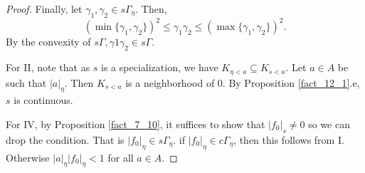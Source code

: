 \documentclass[8pt]{article}
\numberwithin{equation}{section}
\newcommand{\ab}[1]{\vert #1 \vert}
\newcommand{\cGamma}[0]{c\Gamma}
\begin{document}
\begin{proof}
    Finally, let $\gamma_1,\gamma_2\in s\Gamma_\eta$. Then,
    \begin{equation*}
        (\min\{\gamma_1,\gamma_2\})^2\leq \gamma_1\gamma_2\leq(\max\{\gamma_1,\gamma_2\})^2.
    \end{equation*}
    By the convexity of $s\Gamma,\gamma1\gamma_2\in s\Gamma$. %
    \par For II, note that as $s$ is a specialization, we have $K_{\eta<a}\subseteq K_{s<a}$. Let $a\in A$ be such that $\ab{a}_\eta$. Then $K_{s<a}$ is a neighborhood of $0$. By Proposition \ref{fact_12_1}.e, $s$ is continuous.  %
    \par For IV, by Proposition \ref{fact_7_10}, it suffices to show that $\ab{f_0}_s\not=0$ so we can drop the condition. That is $\ab{f_0}_\eta\in s\Gamma_\eta$. if $\ab{f_0}_\eta\in\cGamma_\eta$, then this follows from I. Otherwise $\ab{a}_\eta\ab{f_0}_\eta<1$ for all $a\in A$.

\end{proof}
\end{document}
